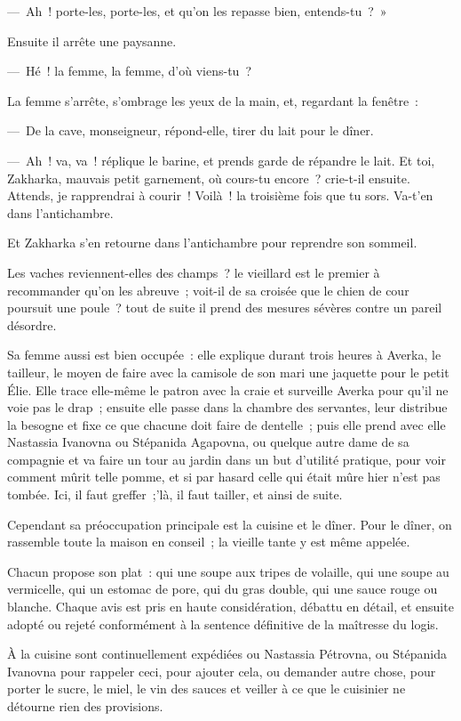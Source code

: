 \documentclass[french,twoside]{book} %
\begin{document}
— Ah ! porte-les, porte-les, et qu’on les repasse bien, entends-tu ? »\par
Ensuite il arrête une paysanne.\par
— Hé ! la femme, la femme, d’où viens-tu ?\par
La femme s’arrête, s’ombrage les yeux de la main, et, regardant la fenêtre :\par
— De la cave, monseigneur, répond-elle, tirer du lait pour le dîner.\par
— Ah ! va, va ! réplique le barine, et prends garde de répandre le lait. Et toi, Zakharka, mauvais petit garnement, où cours-tu encore ? crie-t-il ensuite. Attends, je rapprendrai à courir ! Voilà ! la troisième fois que tu sors. Va-t’en dans l’antichambre.\par
Et Zakharka s’en retourne dans l’antichambre pour reprendre son sommeil.\par
Les vaches reviennent-elles des champs ? le vieillard est le premier à recommander qu’on les abreuve ; voit-il de sa croisée que le chien de cour poursuit une poule ? tout de suite il prend des mesures sévères contre un pareil désordre.\par
Sa femme aussi est bien occupée : elle explique durant trois heures à Averka, le tailleur, le moyen de faire avec la camisole de son mari une jaquette pour le petit Élie. Elle trace elle-même le patron avec la craie et surveille Averka pour qu’il ne voie pas le drap ; ensuite elle passe dans la chambre des servantes, leur distribue la besogne et fixe ce que chacune doit faire de dentelle ; puis elle prend avec elle Nastassia Ivanovna ou Stépanida Agapovna, ou quelque autre dame de sa compagnie et va faire un tour au jardin dans un but d’utilité pratique, pour voir comment mûrit telle pomme, et si par hasard celle qui était mûre hier n’est pas tombée. Ici, il faut greffer ;’là, il faut tailler, et ainsi de suite.\par
Cependant sa préoccupation principale est la cuisine et le dîner. Pour le dîner, on rassemble toute la maison en conseil ; la vieille tante y est même appelée.\par
Chacun propose son plat : qui une soupe aux tripes de volaille, qui une soupe au vermicelle, qui un estomac de pore, qui du gras double, qui une sauce rouge ou blanche. Chaque avis est pris en haute considération, débattu en détail, et ensuite adopté ou rejeté conformément à la sentence définitive de la maîtresse du logis.\par
À la cuisine sont continuellement expédiées ou Nastassia Pétrovna, ou Stépanida Ivanovna pour rappeler ceci, pour ajouter cela, ou demander autre chose, pour porter le sucre, le miel, le vin des sauces et veiller à ce que le cuisinier ne détourne rien des provisions.\par
\end{document}

